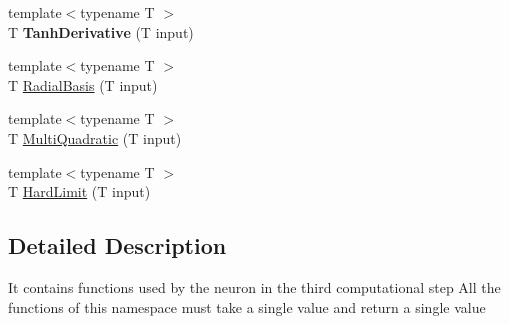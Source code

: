 \begin{DoxyCompactItemize}
\item 
\hypertarget{namespace_transfer_functions_ae8021fc6db8a440800c7d02b9a4dfa42}{{\footnotesize template$<$typename T $>$ }\\T {\bfseries Tanh\-Derivative} (T input)}\label{namespace_transfer_functions_ae8021fc6db8a440800c7d02b9a4dfa42}

\item 
{\footnotesize template$<$typename T $>$ }\\T \hyperlink{namespace_transfer_functions_a20953b42a150ac8c6f482831cabb097f}{Radial\-Basis} (T input)
\item 
{\footnotesize template$<$typename T $>$ }\\T \hyperlink{namespace_transfer_functions_a779825bc04818589560e97f5749d5138}{Multi\-Quadratic} (T input)
\item 
{\footnotesize template$<$typename T $>$ }\\T \hyperlink{namespace_transfer_functions_a7f603d213bbeb492c8362547cedab5a2}{Hard\-Limit} (T input)
\end{DoxyCompactItemize}


\subsection{Detailed Description}
It contains functions used by the neuron in the third computational step All the functions of this namespace must take a single value and return a single value 


